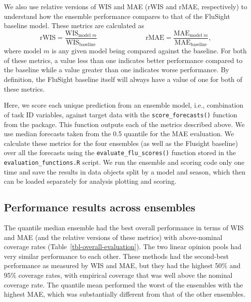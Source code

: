\documentclass[
  article,
  shortnames,
  notitle]{jss}
\begin{document}
We also use relative versions of WIS and MAE (rWIS and rMAE,
respectively) to understand how the ensemble performance compares to
that of the FluSight baseline model. These metrics are calculated as
\[\textrm{rWIS} = \frac{\textrm{WIS}_{\textrm{model }m}}{\textrm{WIS}_{\textrm{baseline}}} \hspace{3cm} \textrm{rMAE} = \frac{\textrm{MAE}_{\textrm{model }m}}{\textrm{MAE}_{\textrm{baseline}}},\]
where model \(m\) is any given model being compared against the
baseline. For both of these metrics, a value less than one indicates
better performance compared to the baseline while a value greater than
one indicates worse performance. By definition, the FluSight baseline
itself will always have a value of one for both of these metrics.

Here, we score each unique prediction from an ensemble model, i.e.,
combination of task ID variables, against target data with the
\texttt{score\_forecasts()} function from the 
package. This function outputs each of the metrics described above. We
use median forecasts taken from the 0.5 quantile for the MAE evaluation.
We calculate these metrics for the four ensembles (as well as the
Flusight baseline) over all the forecasts using the
\texttt{evaluate\_flu\_scores()} function stored in the
\texttt{evaluation\_functions.R} script. We run the ensemble and scoring
code only one time and save the results in data objects split by a model
and season, which then can be loaded separately for analysis plotting
and scoring.

\subsection{Performance results across
ensembles}\label{performance-results-across-ensembles}

The quantile median ensemble had the best overall performance in terms
of WIS and MAE (and the relative versions of these metrics) with
above-nominal coverage rates (Table~\ref{tbl-overall-evaluation}). The
two linear opinion pools had very similar performance to each other.
These methods had the second-best performance as measured by WIS and
MAE, but they had the highest 50\% and 95\% coverage rates, with
empirical coverage that was well above the nominal coverage rate. The
quantile mean performed the worst of the ensembles with the highest MAE,
which was substantially different from that of the other ensembles.
\end{document}
